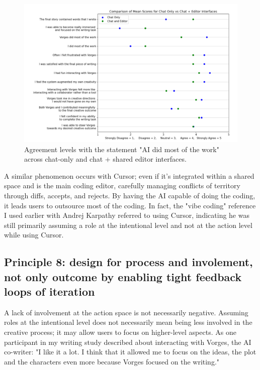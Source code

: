 \begin{figure}
    \centering
    \includegraphics[width=1\linewidth]{graphsharedspaces.png}
    \caption{Agreement levels with the statement "AI did most of the work" across chat-only and chat + shared editor interfaces.}
    \label{fig:graphsharedspaces}
\end{figure}

A similar phenomenon occurs with Cursor; even if it's integrated within a shared space and is the main coding editor, carefully managing conflicts of territory through diffs, accepts, and rejects. By having the AI capable of doing the coding, it leads users to outsource most of the coding. In fact, the "vibe coding" reference I used earlier with Andrej Karpathy referred to using Cursor, indicating he was still primarily assuming a role at the intentional level and not at the action level while using Cursor.


\subsection{Principle 8: design for process and involement, not only outcome by enabling tight feedback loops of iteration}

A lack of involvement at the action space is not necessarily negative. Assuming roles at the intentional level does not necessarily mean being less involved in the creative process; it may allow users to focus on higher-level aspects. As one participant in my writing study described about interacting with Vorges, the AI co-writer: "I like it a lot. I think that it allowed me to focus on the ideas, the plot and the characters even more because Vorges focused on the writing."

